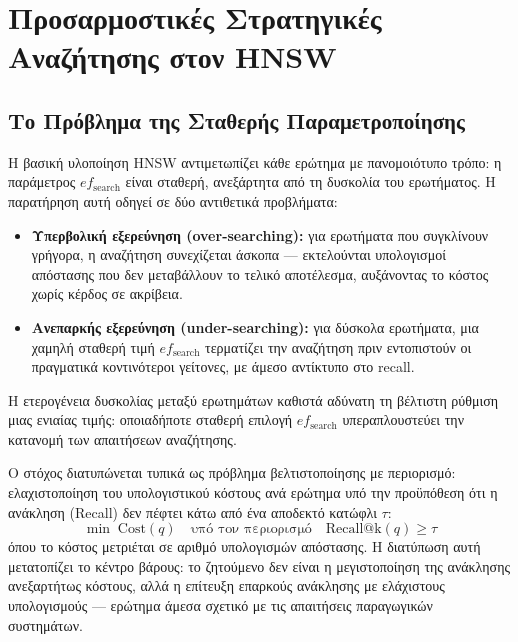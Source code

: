\documentclass[12pt,a4paper]{article}
\begin{document}
\section{Προσαρμοστικές Στρατηγικές Αναζήτησης στον HNSW}

\subsection{Το Πρόβλημα της Σταθερής Παραμετροποίησης}
Η βασική υλοποίηση HNSW αντιμετωπίζει κάθε ερώτημα με πανομοιότυπο τρόπο: η παράμετρος $ef_{\text{search}}$ είναι σταθερή, ανεξάρτητα από τη δυσκολία του ερωτήματος. Η παρατήρηση αυτή οδηγεί σε δύο αντιθετικά προβλήματα:
\begin{itemize}
    \item \textbf{Υπερβολική εξερεύνηση (over-searching):} για ερωτήματα που συγκλίνουν γρήγορα, η αναζήτηση συνεχίζεται άσκοπα --- εκτελούνται υπολογισμοί απόστασης που δεν μεταβάλλουν το τελικό αποτέλεσμα, αυξάνοντας το κόστος χωρίς κέρδος σε ακρίβεια.
    \item \textbf{Ανεπαρκής εξερεύνηση (under-searching):} για δύσκολα ερωτήματα, μια χαμηλή σταθερή τιμή $ef_{\text{search}}$ τερματίζει την αναζήτηση πριν εντοπιστούν οι πραγματικά κοντινότεροι γείτονες, με άμεσο αντίκτυπο στο recall.
\end{itemize}
Η ετερογένεια δυσκολίας μεταξύ ερωτημάτων καθιστά αδύνατη τη βέλτιστη ρύθμιση μιας ενιαίας τιμής: οποιαδήποτε σταθερή επιλογή $ef_{\text{search}}$ υπεραπλουστεύει την κατανομή των απαιτήσεων αναζήτησης.

Ο στόχος διατυπώνεται τυπικά ως πρόβλημα βελτιστοποίησης με περιορισμό: ελαχιστοποίηση του υπολογιστικού κόστους ανά ερώτημα υπό την προϋπόθεση ότι η ανάκληση (Recall) δεν πέφτει κάτω από ένα αποδεκτό κατώφλι $\tau$:
\[
\min \; \text{Cost}(q) \quad \text{υπό τον περιορισμό}\quad \text{Recall@k}(q) \ge \tau
\]
όπου το κόστος μετριέται σε αριθμό υπολογισμών απόστασης. Η διατύπωση αυτή μετατοπίζει το κέντρο βάρους: το ζητούμενο δεν είναι η μεγιστοποίηση της ανάκλησης ανεξαρτήτως κόστους, αλλά η επίτευξη επαρκούς ανάκλησης με ελάχιστους υπολογισμούς — ερώτημα άμεσα σχετικό με τις απαιτήσεις παραγωγικών συστημάτων.
\end{document}
